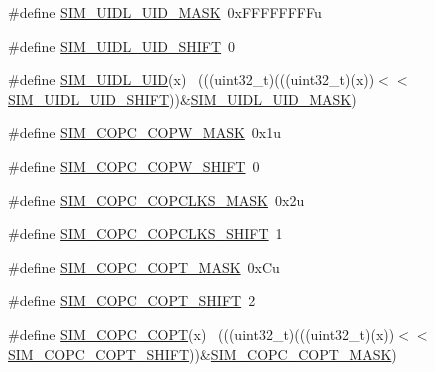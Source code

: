 \begin{DoxyCompactItemize}
\item 
\#define \hyperlink{group___s_i_m___register___masks_ga412340eabbcd0f0d48ce4886e9beb071}{S\+I\+M\+\_\+\+U\+I\+D\+L\+\_\+\+U\+I\+D\+\_\+\+M\+A\+SK}~0x\+F\+F\+F\+F\+F\+F\+F\+Fu
\item 
\#define \hyperlink{group___s_i_m___register___masks_ga6fb1383717ebfa6f47b5a5952fd21d63}{S\+I\+M\+\_\+\+U\+I\+D\+L\+\_\+\+U\+I\+D\+\_\+\+S\+H\+I\+FT}~0
\item 
\#define \hyperlink{group___s_i_m___register___masks_gadf1a47bfdde94787a3e6e785332aef8e}{S\+I\+M\+\_\+\+U\+I\+D\+L\+\_\+\+U\+ID}(x)                                                ~(((uint32\+\_\+t)(((uint32\+\_\+t)(x))$<$$<$\hyperlink{group___s_i_m___register___masks_ga6fb1383717ebfa6f47b5a5952fd21d63}{S\+I\+M\+\_\+\+U\+I\+D\+L\+\_\+\+U\+I\+D\+\_\+\+S\+H\+I\+FT}))\&\hyperlink{group___s_i_m___register___masks_ga412340eabbcd0f0d48ce4886e9beb071}{S\+I\+M\+\_\+\+U\+I\+D\+L\+\_\+\+U\+I\+D\+\_\+\+M\+A\+SK})
\item 
\#define \hyperlink{group___s_i_m___register___masks_gabea5c1af6c493fe6e417dd6c3eba4ad6}{S\+I\+M\+\_\+\+C\+O\+P\+C\+\_\+\+C\+O\+P\+W\+\_\+\+M\+A\+SK}~0x1u
\item 
\#define \hyperlink{group___s_i_m___register___masks_ga219c76cc0f76e8ba2cbe438cb80cb6cc}{S\+I\+M\+\_\+\+C\+O\+P\+C\+\_\+\+C\+O\+P\+W\+\_\+\+S\+H\+I\+FT}~0
\item 
\#define \hyperlink{group___s_i_m___register___masks_ga05e787905b2cb2c97a688a31c461235f}{S\+I\+M\+\_\+\+C\+O\+P\+C\+\_\+\+C\+O\+P\+C\+L\+K\+S\+\_\+\+M\+A\+SK}~0x2u
\item 
\#define \hyperlink{group___s_i_m___register___masks_ga61c1964987078934db4ab11e5358b51a}{S\+I\+M\+\_\+\+C\+O\+P\+C\+\_\+\+C\+O\+P\+C\+L\+K\+S\+\_\+\+S\+H\+I\+FT}~1
\item 
\#define \hyperlink{group___s_i_m___register___masks_gaf9109bf584bb00c7c6bcf002582b2905}{S\+I\+M\+\_\+\+C\+O\+P\+C\+\_\+\+C\+O\+P\+T\+\_\+\+M\+A\+SK}~0x\+Cu
\item 
\#define \hyperlink{group___s_i_m___register___masks_gafc24142fbaab3d1f12a325df24e7887f}{S\+I\+M\+\_\+\+C\+O\+P\+C\+\_\+\+C\+O\+P\+T\+\_\+\+S\+H\+I\+FT}~2
\item 
\#define \hyperlink{group___s_i_m___register___masks_ga890e670284374ab35a25d29c5c047e27}{S\+I\+M\+\_\+\+C\+O\+P\+C\+\_\+\+C\+O\+PT}(x)                                              ~(((uint32\+\_\+t)(((uint32\+\_\+t)(x))$<$$<$\hyperlink{group___s_i_m___register___masks_gafc24142fbaab3d1f12a325df24e7887f}{S\+I\+M\+\_\+\+C\+O\+P\+C\+\_\+\+C\+O\+P\+T\+\_\+\+S\+H\+I\+FT}))\&\hyperlink{group___s_i_m___register___masks_gaf9109bf584bb00c7c6bcf002582b2905}{S\+I\+M\+\_\+\+C\+O\+P\+C\+\_\+\+C\+O\+P\+T\+\_\+\+M\+A\+SK})

\end{DoxyCompactItemize}
